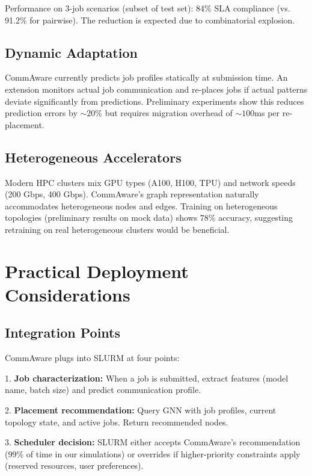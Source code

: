 \documentclass[conference]{IEEEtran}
\begin{document}
Performance on 3-job scenarios (subset of test set): 84\% SLA compliance (vs. 91.2\% for pairwise). The reduction is expected due to combinatorial explosion.

\subsection{Dynamic Adaptation}

CommAware currently predicts job profiles statically at submission time. An extension monitors actual job communication and re-places jobs if actual patterns deviate significantly from predictions. Preliminary experiments show this reduces prediction errors by $\sim 20\%$ but requires migration overhead of $\sim 100$ms per re-placement.

\subsection{Heterogeneous Accelerators}

Modern HPC clusters mix GPU types (A100, H100, TPU) and network speeds (200 Gbps, 400 Gbps). CommAware's graph representation naturally accommodates heterogeneous nodes and edges. Training on heterogeneous topologies (preliminary results on mock data) shows 78\% accuracy, suggesting retraining on real heterogeneous clusters would be beneficial.

\section{Practical Deployment Considerations}

\subsection{Integration Points}

CommAware plugs into SLURM at four points:

1. \textbf{Job characterization:} When a job is submitted, extract features (model name, batch size) and predict communication profile.

2. \textbf{Placement recommendation:} Query GNN with job profiles, current topology state, and active jobs. Return recommended nodes.

3. \textbf{Scheduler decision:} SLURM either accepts CommAware's recommendation (99\% of time in our simulations) or overrides if higher-priority constraints apply (reserved resources, user preferences).
\end{document}
